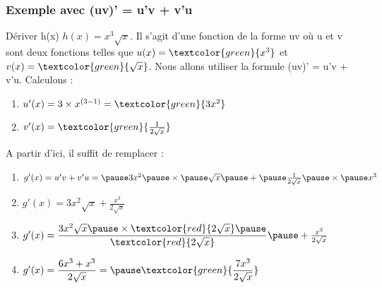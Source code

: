 \documentclass[t]{beamer}
\begin{document}
\begin{frame}
\frametitle{Exemple avec (uv)' = u'v + v'u}
\pause
\begin{block}{Dériver h(x)}
	$h(x) = x^3 \sqrt{x}$. \pause Il s'agit d'une fonction de la forme uv \pause où u et v sont deux fonctions \pause telles que $u(x) = \textcolor{green}{x^3}$ \pause et $v(x) = \textcolor{green}{\sqrt{x}}$. \pause Nous allons utiliser la formule (uv)' = u'v + v'u. \pause Calculons :
	\begin{enumerate}{}
		\item<+-> \(u'(x)= 3 \times x^{(3-1)} = \textcolor{green}{3x^2} \)
		\item<+-> \(v'(x) = \textcolor{green}{\frac{1}{2 \sqrt{x}}} \) 
	\end{enumerate}
	\pause
	A partir d'ici, il suffit de remplacer : \pause
	\begin{enumerate}[]
	\pause
	\item\(g'(x) = u'v + v'u = \pause 3x^2 \pause \times \pause \sqrt{x} \pause + \pause \frac{1}{2 \sqrt{x}} \pause \times \pause x^3\)
	\pause
	\item \(g'(x) = 3x^2 \sqrt{x} + \frac{x^3}{2 \sqrt{x}} \)
	\pause
	\item\(g'(x) = \dfrac{3x^2 \sqrt{x} \pause \times \textcolor{red}{2\sqrt{x}}\pause}{\textcolor{red}{2\sqrt{x}}} \pause + \frac{x^3}{2 \sqrt{x}} \)
	\pause
	\item \(g'(x) = \dfrac{6x^3 + x^3}{2\sqrt{x}} = \pause \textcolor{green}{\dfrac{7x^3}{2\sqrt{x}}} \)
	\end{enumerate}	
\end{block}
\end{frame}
\end{document}

